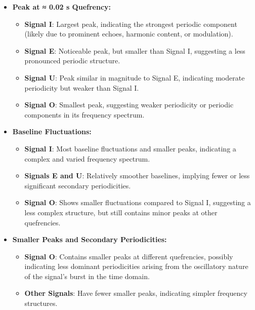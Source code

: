 \documentclass[a4paper,12pt]{article}
\begin{document}
\begin{itemize}

    \item \textbf{Peak at ≈ 0.02 s Quefrency:}
    \begin{itemize}
        \item \textbf{Signal I}: Largest peak, indicating the strongest periodic component (likely due to prominent echoes, harmonic content, or modulation).
        \item \textbf{Signal E}: Noticeable peak, but smaller than Signal I, suggesting a less pronounced periodic structure.
        \item \textbf{Signal U}: Peak similar in magnitude to Signal E, indicating moderate periodicity but weaker than Signal I.
        \item \textbf{Signal O}: Smallest peak, suggesting weaker periodicity or periodic components in its frequency spectrum.
    \end{itemize}

    \item \textbf{Baseline Fluctuations:}
    \begin{itemize}
        \item \textbf{Signal I}: Most baseline fluctuations and smaller peaks, indicating a complex and varied frequency spectrum.
        \item \textbf{Signals E and U}: Relatively smoother baselines, implying fewer or less significant secondary periodicities.
        \item \textbf{Signal O}: Shows smaller fluctuations compared to Signal I, suggesting a less complex structure, but still contains minor peaks at other quefrencies.
    \end{itemize}

    \item \textbf{Smaller Peaks and Secondary Periodicities:}
    \begin{itemize}
        \item \textbf{Signal O}: Contains smaller peaks at different quefrencies, possibly indicating less dominant periodicities arising from the oscillatory nature of the signal's burst in the time domain.
        \item \textbf{Other Signals}: Have fewer smaller peaks, indicating simpler frequency structures.
    \end{itemize}


\end{itemize}
\end{document}
